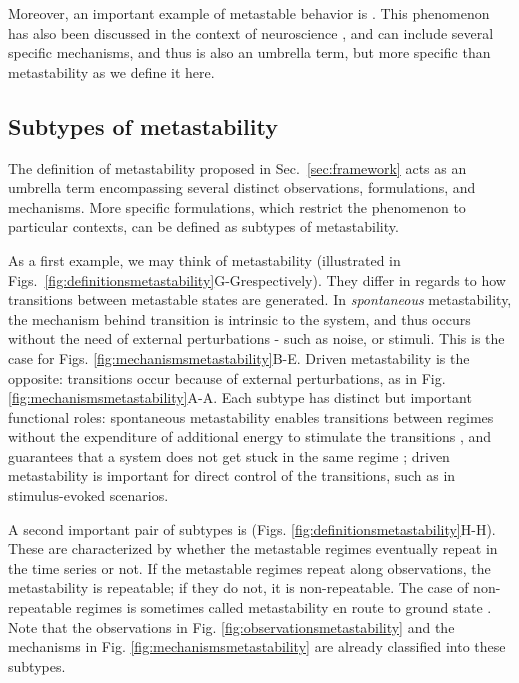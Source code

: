 Moreover, an important example of metastable behavior is  \cite{kaneko2003chaotic}. This phenomenon has also been discussed in the context of neuroscience \cite{freeman2003evidence, tsuda2009hypotheses, tsuda2015chaotic}, and can include several specific mechanisms, and thus is also an umbrella term, but more specific than metastability as we define it here.



\subsection{Subtypes of metastability} \label{sec:subtypes}
The definition of metastability proposed in Sec.~\ref{sec:framework} acts as an umbrella term encompassing several distinct observations, formulations, and mechanisms. More specific formulations, which restrict the phenomenon to particular contexts, can be defined as subtypes of metastability. 

As a first example, we may think of  metastability (illustrated in Figs.~\ref{fig:definitionsmetastability}G-G\supprime respectively). They differ in regards to how transitions between metastable states are generated. In \textit{spontaneous} metastability, the mechanism behind transition is intrinsic to the system, and thus occurs without the need of external perturbations - such as noise, or stimuli. This is the case for Figs. \ref{fig:mechanismsmetastability}B-E\ssupprime. Driven metastability is the opposite: transitions occur because of external perturbations, as in Fig. \ref{fig:mechanismsmetastability}A-A\ssupprime. Each subtype has distinct but important functional roles: spontaneous metastability enables transitions between regimes without the expenditure of additional energy to stimulate the transitions \cite{tognoli2014metastable}, and guarantees that a system does not get stuck in the same regime \cite{ito2008dynamics}; driven metastability is important for direct control of the transitions, such as in stimulus-evoked scenarios.

A second important pair of subtypes is  (Figs. \ref{fig:definitionsmetastability}H-H\supprime). These are characterized by whether the metastable regimes eventually repeat in the time series or not. If the metastable regimes repeat along observations, the metastability is repeatable; if they do not, it is non-repeatable. The case of non-repeatable regimes is sometimes called metastability en route to ground state \cite{brinkman2022metastable}. Note that the observations in Fig. \ref{fig:observationsmetastability} and the mechanisms in Fig. \ref{fig:mechanismsmetastability} are already classified into these subtypes. 


